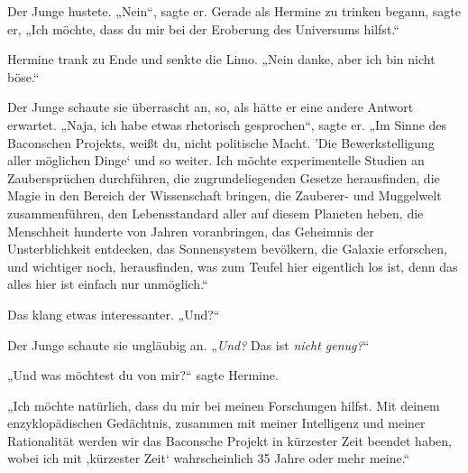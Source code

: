 Der Junge hustete. „Nein“, sagte er. Gerade als Hermine zu trinken begann, sagte er, „Ich möchte, dass du mir bei der Eroberung des Universums hilfst.“

Hermine trank zu Ende und senkte die Limo. „Nein danke, aber ich bin nicht böse.“

Der Junge schaute sie überrascht an, so, als hätte er eine andere Antwort erwartet. „Naja, ich habe etwas rhetorisch gesprochen“, sagte er. „Im Sinne des Baconschen Projekts, weißt du, nicht politische Macht. ’Die Bewerkstelligung aller möglichen Dinge‘ und so weiter. Ich möchte experimentelle Studien an Zaubersprüchen durchführen, die zugrundeliegenden Gesetze herausfinden, die Magie in den Bereich der Wissenschaft bringen, die Zauberer- und Muggelwelt zusammenführen, den Lebensstandard aller auf diesem Planeten heben, die Menschheit hunderte von Jahren voranbringen, das Geheimnis der Unsterblichkeit entdecken, das Sonnensystem bevölkern, die Galaxie erforschen, und wichtiger noch, herausfinden, was zum Teufel hier eigentlich los ist, denn das alles hier ist einfach nur unmöglich.“

Das klang etwas interessanter. „Und?“

Der Junge schaute sie ungläubig an. „\emph{Und?} Das ist \emph{nicht genug?}“

„Und was möchtest du von mir?“ sagte Hermine.

„Ich möchte natürlich, dass du mir bei meinen Forschungen hilfst. Mit deinem enzyklopädischen Gedächtnis, zusammen mit meiner Intelligenz und meiner Rationalität werden wir das Baconsche Projekt in kürzester Zeit beendet haben, wobei ich mit ‚kürzester Zeit‘ wahrscheinlich 35 Jahre oder mehr meine.“

